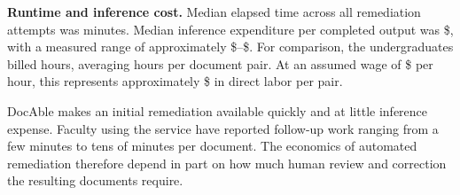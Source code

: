 
\textbf{Runtime and inference cost.} Median elapsed time across all  remediation attempts was  minutes. Median inference expenditure per completed output was \$, with a measured range of approximately \$--\$. For comparison, the undergraduates billed  hours, averaging  hours per document pair. At an assumed wage of \$ per hour, this represents approximately \$ in direct labor per pair.

DocAble makes an initial remediation available quickly and at little inference expense. Faculty using the service have reported follow-up work ranging from a few minutes to tens of minutes per document. The economics of automated remediation therefore depend in part on how much human review and correction the resulting documents require.


